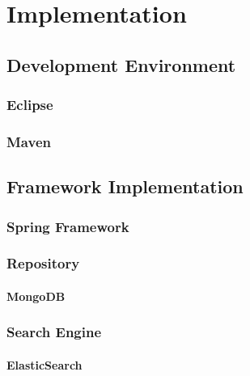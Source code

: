 \chapter{Implementation\label{cha:chapter5}}

\section{Development Environment\label{sec:impl_ecl}}
	
	\subsection{Eclipse\label{sec:impl_ecl}}
	
	\subsection{Maven\label{sec:impl_ecl}}
	
\section{Framework Implementation\label{sec:impl_used_op_sr}}

	\subsection{Spring Framework\label{sec:impl_sp_fr}}
	
	\subsection{Repository\label{sec:des_repo}}
	\subsubsection{MongoDB\label{sec:impl_mon}}
	
	\subsection{Search Engine\label{sec:des_se_en}}
	\subsubsection{ElasticSearch\label{sec:impl_el_se}}
	
